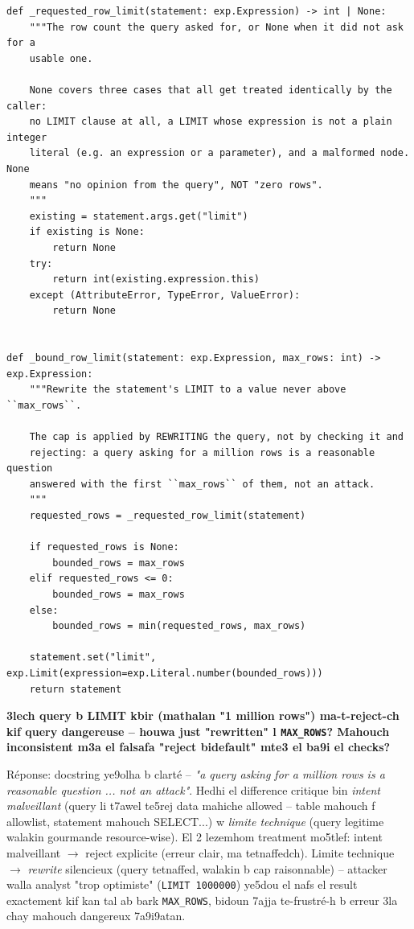 \documentclass[11pt,a4paper]{report}
\DeclareRobustCommand{\code}[1]{\texttt{#1}}
\begin{document}
\begin{lstlisting}[style=pystyle]
def _requested_row_limit(statement: exp.Expression) -> int | None:
    """The row count the query asked for, or None when it did not ask for a
    usable one.

    None covers three cases that all get treated identically by the caller:
    no LIMIT clause at all, a LIMIT whose expression is not a plain integer
    literal (e.g. an expression or a parameter), and a malformed node. None
    means "no opinion from the query", NOT "zero rows".
    """
    existing = statement.args.get("limit")
    if existing is None:
        return None
    try:
        return int(existing.expression.this)
    except (AttributeError, TypeError, ValueError):
        return None


def _bound_row_limit(statement: exp.Expression, max_rows: int) -> exp.Expression:
    """Rewrite the statement's LIMIT to a value never above ``max_rows``.

    The cap is applied by REWRITING the query, not by checking it and
    rejecting: a query asking for a million rows is a reasonable question
    answered with the first ``max_rows`` of them, not an attack.
    """
    requested_rows = _requested_row_limit(statement)

    if requested_rows is None:
        bounded_rows = max_rows
    elif requested_rows <= 0:
        bounded_rows = max_rows
    else:
        bounded_rows = min(requested_rows, max_rows)

    statement.set("limit", exp.Limit(expression=exp.Literal.number(bounded_rows)))
    return statement
\end{lstlisting}

\begin{soual}
\textbf{3lech query b LIMIT kbir (mathalan "1 million rows") ma-t-reject-ch
kif query dangereuse -- houwa just "rewritten" l \code{MAX\_ROWS}? Mahouch
inconsistent m3a el falsafa "reject bidefault" mte3 el ba9i el checks?}

Réponse: docstring ye9olha b clarté -- \emph{"a query asking for a million
rows is a reasonable question ... not an attack"}. Hedhi el difference
critique bin \emph{intent malveillant} (query li t7awel te5rej data
mahiche allowed -- table mahouch f allowlist, statement mahouch SELECT...)
w \emph{limite technique} (query legitime walakin gourmande resource-wise).
El 2 lezemhom treatment mo5tlef: intent malveillant $\to$ reject explicite
(erreur clair, ma tetnaffedch). Limite technique $\to$ \emph{rewrite}
silencieux (query tetnaffed, walakin b cap raisonnable) -- attacker
walla analyst "trop optimiste" (\code{LIMIT 1000000}) ye5dou el nafs
el result exactement kif kan tal ab bark \code{MAX\_ROWS}, bidoun 7ajja
te-frustré-h b erreur 3la chay mahouch dangereux 7a9i9atan.
\end{soual}
\end{document}
